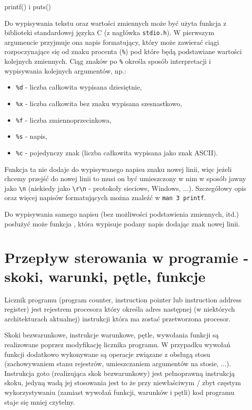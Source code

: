 \begin{ProTip}{printf() i puts()}

Do wypisywania tekstu oraz wartości zmiennych może być użyta funkcja  z biblioteki standardowej języka C (z nagłówka \Verb$stdio.h$).
W pierwszym argumencie przyjmuje ona napis formatujący, który może zawierać ciągi rozpoczynające się od znaku procenta (\Verb$%$) pod które będą podstawiane wartości kolejnych zmiennych.
Ciąg znaków po \Verb$%$ określa sposób interpretacji i wypisywania kolejnych argumentów, np.:
\begin{itemize}
	\item \Verb#%d# - liczba całkowita wypisana dziesiętnie,
	\item \Verb#%x# - liczba całkowita bez znaku wypisana szesnastkowo,
	\item \Verb#%f# - liczba zmiennoprzecinkowa,
	\item \Verb#%s# - napis,
	\item \Verb#%c# - pojedynczy znak (liczba całkowita wypisana jako znak ASCII).
\end{itemize}
Funkcja ta nie dodaje do wypisywanego napisu znaku nowej linii, więc jeżeli chcemy przejść do nowej linii to musi on być umieszczony w nim w sposób jawny jako \Verb#\n# (niekiedy jako \Verb#\r\n# - protokoły sieciowe, Windows, ...).
Szczegółowy opis  oraz więcej napisów formatujących można znaleźć w \Verb#man 3 printf#.

\vspace{8pt}
Do wypisywania samego napisu (bez możliwości podstawienia zmiennych, itd.) posłużyć może funkcja , która wypisuje podany napis dodając znak nowej linii.
\end{ProTip}

\section{Przepływ sterowania w programie - skoki, warunki, pętle, funkcje}

Licznik programu (program counter, instruction pointer lub instruction address register)
jest rejestrem procesora który określa adres następnej (w niektórych architekturach aktualnej) instrukcji która ma zostać przetworzona procesor.

Skoki bezwarunkowe, instrukcje warunkowe, pętle, wywołania funkcji są realizowane poprzez modyfikację licznika programu. W przypadku wywołań funkcji dodatkowo wykonywane są operacje związane z obsługą stosu (zachowywaniem stanu rejestrów, umieszczaniem argumentów na stosie, ...). Instrukcja goto (realizująca skok bezwarunkowy) jest pełnoprawną instrukcją skoku, jedyną wadą jej stosowania jest to że przy niewłaściwym / zbyt częstym wykorzystywaniu (zamiast wywołań funkcji, warunków i pętli) kod programu staje się mniej czytelny.

